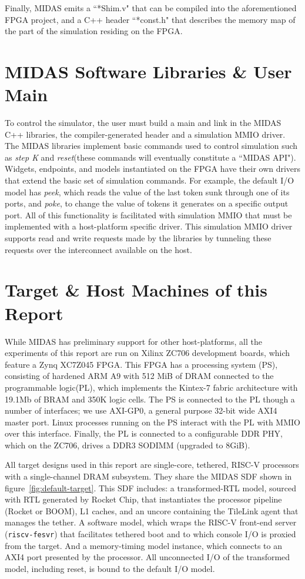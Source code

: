 Finally, MIDAS emits a ``*Shim.v" that can be compiled into the aforementioned
FPGA project, and a C++ header ``*const.h" that describes the memory map of the
part of the simulation residing on the FPGA.

\section{MIDAS Software Libraries \& User Main}

To control the simulator, the user must build a main and link in the MIDAS C++
libraries, the compiler-generated header and a simulation MMIO driver.  The
MIDAS libraries implement basic commands used to control simulation such as
\emph{step K} and \emph{reset}(these commands will eventually constitute a
``MIDAS API"). Widgets, endpoints, and models instantiated on the FPGA have
their own drivers that extend the basic set of simulation commands. For
example, the default I/O model has \emph{peek}, which reads the value of the
last token sunk through one of its ports, and \emph{poke}, to change the value
of tokens it generates on a specific output port.  All of this functionality is
facilitated with simulation MMIO that must be implemented with a host-platform
specific driver. This simulation MMIO driver supports read and write requests
made by the libraries by tunneling these requests over the interconnect available
on the host.

\section{Target \& Host Machines of this Report}\label{sec:targetandhostmachines}

While MIDAS has preliminary support for other host-platforms, all the
experiments of this report are run on Xilinx ZC706 development boards, which
feature a Zynq XC7Z045 FPGA. This FPGA has a processing system (PS),
consisting of hardened ARM A9 with 512 MiB of DRAM connected to the
programmable logic(PL), which implements the Kintex-7 fabric architecture with
19.1Mb of BRAM and 350K logic cells. The PS is connected to the PL though a
number of interfaces; we use AXI-GP0, a general purpose 32-bit wide AXI4 master port.
Linux processes running on the PS interact with the PL with MMIO over this
interface. Finally, the PL is connected to a configurable DDR PHY, which on the
ZC706, drives a DDR3 SODIMM (upgraded to 8GiB).

All target designs used in this report are single-core, tethered, RISC-V
processors with a single-channel DRAM subsystem.  They share the MIDAS SDF
shown in figure~\ref{fig:default-target}. This SDF includes: a transformed-RTL
model, sourced with RTL generated by Rocket Chip, that instantiates the
processor pipeline (Rocket or BOOM), L1 caches, and an uncore containing the
TileLink agent that manages the tether. A software model, which wraps the
RISC-V front-end server (\texttt{riscv-fesvr}) that facilitates tethered boot
and to which console I/O is proxied from the target. And a memory-timing
model instance, which connects to an AXI4 port presented by the processor.
All unconnected I/O of the transformed model, including reset, is bound to the
default I/O model.

